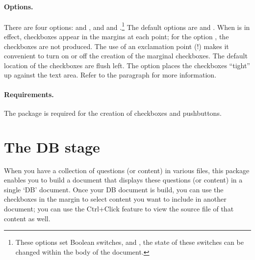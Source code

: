 \documentclass{article}
\def\FmtMP#1{\marginpar{\small\itshape\raggedleft#1}}
\let\uif\textsf
\begin{document}
\paragraph*{Options.} There are four options:  and \FmtMP{\opt{dbmode}\\\relax\opt{!dbmode}},
and  and
\FmtMP{\opt{tight}\\\relax\opt{!tight}}.\footnote{These options
set Boolean switches,  and , the state of
these switches can be changed within the body of the document.} The default
options are  and . When  is in effect,
checkboxes appear in the margins at each  point; for the option
, the checkboxes are not produced. The use of an exclamation
point (!) makes it convenient to turn on or off the creation of the marginal
checkboxes. The default location of the checkboxes are flush left. The
 option places the checkboxes ``tight'' up against the text area.
Refer to the \textbf{} paragraph for more information.

\paragraph*{Requirements.} The  package is required for the creation of
checkboxes and push\-buttons.

\section{The DB stage}

When you have a collection of questions (or content) in various files, this
package enables you to build a document that displays these questions (or
content) in a single `DB' document. Once your DB document is build, you can
use the checkboxes in the margin to select content you want to include in
another document; you can use the \uif{Ctrl+Click} feature to view the source
file of that content as well.
\end{document}
